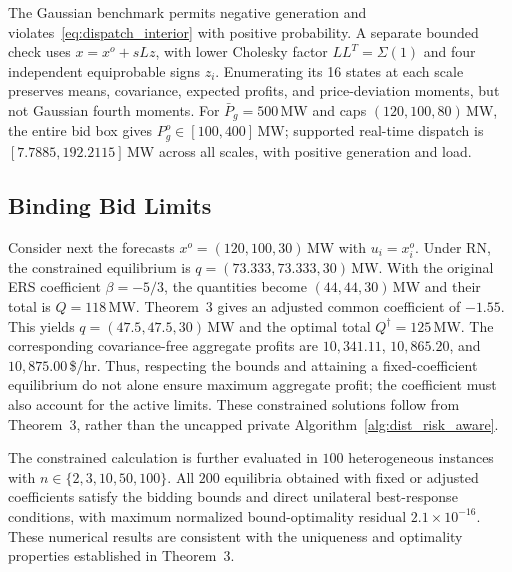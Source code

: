 \documentclass[journal]{IEEEtran}
\begin{document}
The Gaussian benchmark permits negative generation and violates~\eqref{eq:dispatch_interior} with positive probability. A separate bounded check uses $x=x^o+sLz$, with lower Cholesky factor $LL^T=\Sigma(1)$ and four independent equiprobable signs $z_i$. Enumerating its 16 states at each scale preserves means, covariance, expected profits, and price-deviation moments, but not Gaussian fourth moments. For $\bar P_g=500$\,MW and caps $(120,100,80)$\,MW, the entire bid box gives $P_g^o\in[100,400]$\,MW; supported real-time dispatch is $[7.7885,192.2115]$\,MW across all scales, with positive generation and load.

\subsection{Binding Bid Limits}
Consider next the forecasts $x^o=(120,100,30)$\,MW with $u_i=x_i^o$. Under RN, the constrained equilibrium is $q=(73.333,73.333,30)$\,MW. With the original ERS coefficient $\beta=-5/3$, the quantities become $(44,44,30)$\,MW and their total is $Q=118$\,MW. Theorem~3 gives an adjusted common coefficient of $-1.55$. This yields $q=(47.5,47.5,30)$\,MW and the optimal total $Q^\dagger=125$\,MW. The corresponding covariance-free aggregate profits are $10{,}341.11$, $10{,}865.20$, and $10{,}875.00$\,\$/hr. Thus, respecting the bounds and attaining a fixed-coefficient equilibrium do not alone ensure maximum aggregate profit; the coefficient must also account for the active limits. These constrained solutions follow from Theorem~3, rather than the uncapped private Algorithm~\ref{alg:dist_risk_aware}.

The constrained calculation is further evaluated in $100$ heterogeneous instances with $n\in\{2,3,10,50,100\}$. All $200$ equilibria obtained with fixed or adjusted coefficients satisfy the bidding bounds and direct unilateral best-response conditions, with maximum normalized bound-optimality residual $2.1\times10^{-16}$. These numerical results are consistent with the uniqueness and optimality properties established in Theorem~3.
\end{document}
